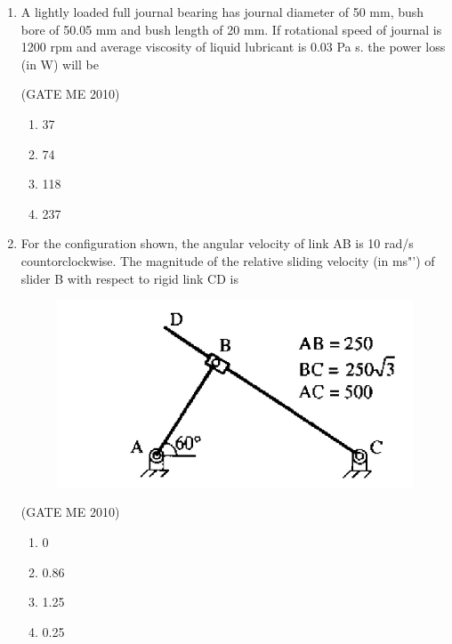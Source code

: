 \documentclass[journal,12pt,onecolumn]{IEEEtran}
\theoremstyle{remark}
\begin{document}
\begin{enumerate}
\begin{multicols}{4}
\begin{enumerate}
\item 0
\item 70CW
\item 140CCW
\item 140CW
\end{enumerate}
\end{multicols}


\item  A lightly loaded full journal bearing has journal diameter of 50 mm, bush bore of 50.05 mm and bush length of 20 mm. If rotational speed of journal is 1200 rpm and average viscosity of liquid lubricant is 0.03 Pa s. the power loss (in W) will be

\hfill{(GATE  ME 2010)}

\begin{multicols}{4}
\begin{enumerate}
    \item 37
    \item 74
    \item 118
    \item 237
\end{enumerate}
\end{multicols}

\item For the configuration shown, the angular velocity of link AB is 10 rad/s countorclockwise. The magnitude of the relative sliding velocity (in ms"') of slider B with respect to rigid link CD is
 \begin{figure}[H]
    \centering
    \includegraphics[width=0.7\columnwidth]{figs/fig4.png}
    \caption*{}
    \label{fig:Q36}
\end{figure}



\hfill{(GATE  ME 2010)}


\begin{multicols}{4}
\begin{enumerate}
\item 0
\item 0.86
\item 1.25
\item 0.25
\end{enumerate}
\end{multicols}



\end{enumerate}
\end{document}
